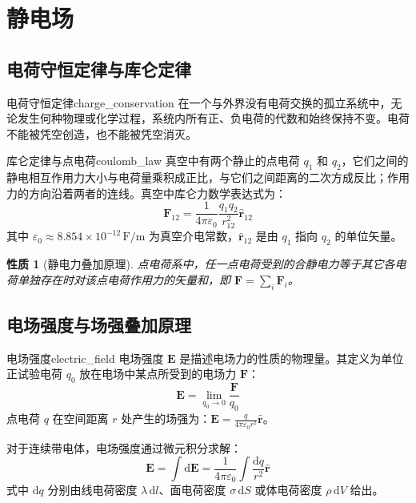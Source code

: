 \documentclass[11pt,a4paper,fontset=fandol]{ctexart}
\newtheorem{property}[theorem]{性质}
\theoremstyle{remark}
\begin{document}
\section{静电场}

\subsection{电荷守恒定律与库仑定律}

\begin{definition}{电荷守恒定律}{charge_conservation}
在一个与外界没有电荷交换的孤立系统中，无论发生何种物理或化学过程，系统内所有正、负电荷的代数和始终保持不变。电荷不能被凭空创造，也不能被凭空消灭。
\end{definition}

\begin{definition}{库仑定律与点电荷}{coulomb_law}
真空中有两个静止的点电荷 $q_1$ 和 $q_2$，它们之间的静电相互作用力大小与电荷量乘积成正比，与它们之间距离的二次方成反比；作用力的方向沿着两者的连线。真空中库仑力数学表达式为：
\begin{equation}
    \bm{F}_{12} = \frac{1}{4\pi\varepsilon_0}\frac{q_1 q_2}{r_{12}^2}\hat{\bm{r}}_{12}
\end{equation}
其中 $\varepsilon_0 \approx 8.854 \times 10^{-12}\,\mathrm{F/m}$ 为真空介电常数，$\hat{\bm{r}}_{12}$ 是由 $q_1$ 指向 $q_2$ 的单位矢量。
\end{definition}

\begin{property}[静电力叠加原理]
点电荷系中，任一点电荷受到的合静电力等于其它各电荷单独存在时对该点电荷作用力的矢量和，即 $\bm{F} = \sum_{i} \bm{F}_i$。
\end{property}

\subsection{电场强度与场强叠加原理}

\begin{definition}{电场强度}{electric_field}
电场强度 $\bm{E}$ 是描述电场力的性质的物理量。其定义为单位正试验电荷 $q_0$ 放在电场中某点所受到的电场力 $\bm{F}$：
\begin{equation}
    \bm{E} = \lim_{q_0 \to 0} \frac{\bm{F}}{q_0}
\end{equation}
点电荷 $q$ 在空间距离 $r$ 处产生的场强为：$\bm{E} = \frac{q}{4\pi\varepsilon_0 r^2}\hat{\bm{r}}$。
\end{definition}

对于连续带电体，电场强度通过微元积分求解：
\begin{equation}
    \bm{E} = \int \mathrm{d}\bm{E} = \frac{1}{4\pi\varepsilon_0} \int \frac{\mathrm{d}q}{r^2}\hat{\bm{r}}
\end{equation}
式中 $\mathrm{d}q$ 分别由线电荷密度 $\lambda\,\mathrm{d}l$、面电荷密度 $\sigma\,\mathrm{d}S$ 或体电荷密度 $\rho\,\mathrm{d}V$ 给出。
\end{document}
